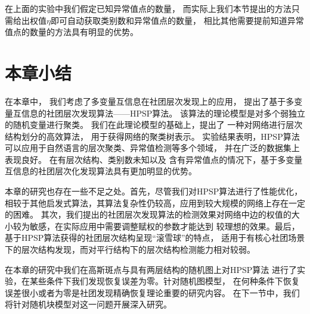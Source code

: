 在上面的实验中我们假定已知异常值点的数量，
而实际上我们本节提出的方法只需给出权值$\eta$即可自动获取类别数和异常值点的数量，
相比其他需要提前知道异常值点的数量的方法具有明显的优势。



\section{本章小结}\label{sec:hierarchical_summary}
在本章中，
我们考虑了多变量互信息在社团层次发现上的应用，
提出了基于多变量互信息的社团层次发现算法——HPSP算法。
该算法的理论模型是对多个弱独立的随机变量进行聚类。
我们在此理论模型的基础上，提出了
一种对网络进行层次结构划分的高效算法，
用于获得网络的聚类树表示。
实验结果表明，HPSP算法可以应用于自然语言的层次聚类、异常值检测等多个领域，
并在广泛的数据集上表现良好。
在有层次结构、类别数未知以及
含有异常值点的情况下，基于多变量互信息的社团层次化发现算法具有更加明显的优势。


本章的研究也存在一些不足之处。首先，尽管我们对HPSP算法进行了性能优化，
相较于其他启发式算法，其算法复杂性仍较高，应用到较大规模的网络上存在一定的困难。
其次，我们提出的社团层次发现算法的检测效果对网络中边的权值的大小较为敏感，在实际应用中需要调整赋权的参数才能达到
较理想的效果。最后，基于HPSP算法获得的社团层次结构呈现“滚雪球”的特点，
适用于有核心社团场景下的层次结构发现，而对平行结构下的层次结构检测能力相对较弱。

在本章的研究中我们在高斯斑点与具有两层结构的随机图上对HPSP算法
进行了实验，在某些条件下我们发现恢复误差为零。针对随机图模型，
在何种条件下恢复误差很小或者为零是社团发现精确恢复理论重要的研究内容。
在下一节中，我们将针对随机块模型对这一问题开展深入研究。
